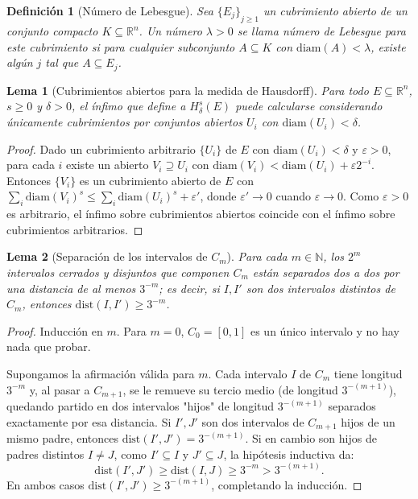 \documentclass[12pt,a4paper]{article}
\theoremstyle{plain}
\theoremstyle{profesional}
\newtheorem{lemma}{Lema}[section]
\theoremstyle{definicion-style}
\newtheorem{definicion}{Definición}[section]
\newcommand{\R}{\mathbb{R}}
\newcommand{\N}{\mathbb{N}}
\begin{document}
\begin{definicion}[Número de Lebesgue]
	Sea \( {\{E_j\}}_{j \ge 1} \) un cubrimiento abierto de un conjunto compacto \( K \subseteq \R^n \). Un número \( \lambda > 0 \) se llama número de Lebesgue para este cubrimiento si para cualquier subconjunto \( A \subseteq K \) con \( \text{diam}(A) < \lambda \), existe algún \( j \) tal que \( A \subseteq E_j \).
\end{definicion}

\begin{lemma}[Cubrimientos abiertos para la medida de Hausdorff]\label{lemma:cubrimientos-abiertos}
	Para todo \( E \subseteq \R^n \), \( s \geq 0 \) y \( \delta > 0 \), el ínfimo que define a \( H^s_\delta(E) \) puede calcularse considerando únicamente cubrimientos por conjuntos \emph{abiertos} \( U_i \) con \( \text{diam}(U_i) < \delta \).
\end{lemma}
\begin{proof}
	Dado un cubrimiento arbitrario \( \{U_i\} \) de \( E \) con \( \text{diam}(U_i) < \delta \) y \( \varepsilon > 0 \), para cada \( i \) existe un abierto \( V_i \supseteq U_i \) con \( \text{diam}(V_i) < \text{diam}(U_i) + \varepsilon 2^{-i} \). Entonces \( \{V_i\} \) es un cubrimiento abierto de \( E \) con \( \sum_i {\text{diam}(V_i)}^s \le \sum_i {\text{diam}(U_i)}^s + \varepsilon' \), donde \( \varepsilon' \to 0 \) cuando \( \varepsilon \to 0 \). Como \( \varepsilon > 0 \) es arbitrario, el ínfimo sobre cubrimientos abiertos coincide con el ínfimo sobre cubrimientos arbitrarios.
\end{proof}

\begin{lemma}[Separación de los intervalos de \( C_m \)]\label{lemma:separacion}
	Para cada \( m \in \N \), los \( 2^m \) intervalos cerrados y disjuntos que componen \( C_m \) están separados dos a dos por una distancia de al menos \( 3^{-m} \); es decir, si \( I, I' \) son dos intervalos distintos de \( C_m \), entonces \( \text{dist}(I, I') \geq 3^{-m} \).
\end{lemma}
\begin{proof}
	Inducción en \( m \). Para \( m = 0 \), \( C_0 = [0,1] \) es un único intervalo y no hay nada que probar.

	Supongamos la afirmación válida para \( m \). Cada intervalo \( I \) de \( C_m \) tiene longitud \( 3^{-m} \) y, al pasar a \( C_{m+1} \), se le remueve su tercio medio (de longitud \( 3^{-(m+1)} \)), quedando partido en dos intervalos "hijos" de longitud \( 3^{-(m+1)} \) separados exactamente por esa distancia. Si \( I', J' \) son dos intervalos de \( C_{m+1} \) hijos de un mismo padre, entonces \( \text{dist}(I', J') = 3^{-(m+1)} \). Si en cambio son hijos de padres distintos \( I \neq J \), como \( I' \subseteq I \) y \( J' \subseteq J \), la hipótesis inductiva da:
	\[
		\text{dist}(I', J') \geq \text{dist}(I, J) \geq 3^{-m} > 3^{-(m+1)}.
	\]
	En ambos casos \( \text{dist}(I', J') \geq 3^{-(m+1)} \), completando la inducción.
\end{proof}
\end{document}
